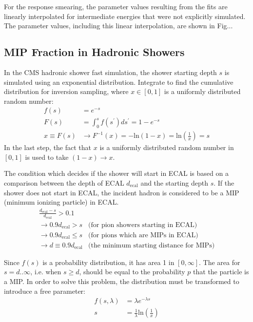 For the response smearing, the parameter values resulting from the fits are linearly interpolated for intermediate energies that were not explicitly simulated. The parameter values, including this linear interpolation, are shown in Fig...


\subsection{MIP Fraction in Hadronic Showers}

In the CMS hadronic shower fast simulation, the shower starting depth $s$ is simulated using an exponential distribution. Integrate to find the cumulative distribution for inversion sampling, where $x \in [0,1]$ is a uniformly distributed random number:
\begin{align}
f(s) &= e^{-s}\\
F(s) &= \int_{0}^{s} f(s^{\prime})ds^{\prime} = 1 - e^{-s}\\
x \equiv F(s) &\rightarrow F^{-1}(x) = -\text{ln}(1-x) = \text{ln}\left(\frac{1}{x}\right) = s
\end{align}
In the last step, the fact that $x$ is a uniformly distributed random number in $[0,1]$ is used to take $(1-x) \rightarrow x$.

The condition which decides if the shower will start in ECAL is based on a comparison between the depth of ECAL $d_{\text{ecal}}$ and the starting depth $s$. If the shower does not start in ECAL, the incident hadron is considered to be a MIP (minimum ionizing particle) in ECAL.
\begin{align}
\frac{d_{\text{ecal}}-s}{d_{\text{ecal}}} > 0.1 &\\
\rightarrow 0.9 d_{\text{ecal}} > s &\text{(for pion showers starting in ECAL)} \\
\rightarrow 0.9 d_{\text{ecal}} \leq s &\text{(for pions which are MIPs in ECAL)} \\
\rightarrow d \equiv 0.9 d_{\text{ecal}} &\text{(the minimum starting distance for MIPs)}
\end{align}

Since $f(s)$ is a probability distribution, it has area 1 in $[0,\infty]$. The area for $s = d..\infty$, i.e. when $s \geq d$, should be equal to the probability $p$ that the particle is a MIP. In order to solve this problem, the distribution must be transformed to introduce a free parameter:
\begin{align}
f(s,\lambda) &= \lambda e^{-\lambda s}\\
s &= \frac{1}{\lambda}\text{ln}\left(\frac{1}{x}\right)
\end{align}

